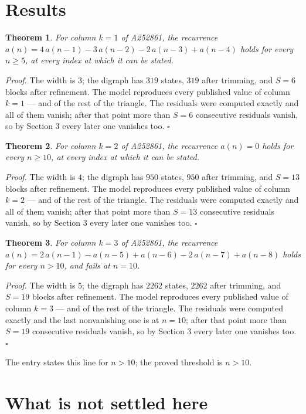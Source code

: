 \documentclass[11pt]{article}
\newtheorem{theorem}{Theorem}
\theoremstyle{definition}
\begin{document}
\section{Results}

\begin{theorem} For column $k = 1$ of A252861, the recurrence $a(n) = 4\,a(n-1) - 3\,a(n-2) - 2\,a(n-3) + a(n-4)$ holds for every $n \ge 5$, at every index at which it can be stated.\end{theorem}

{\itshape Proof.} The width is $3$; the digraph has $319$ states, $319$ after trimming, and $S = 6$ blocks after refinement. The model reproduces every published value of column $k = 1$ --- and of the rest of the triangle. The residuals were computed exactly and all of them vanish; after that point more than $S = 6$ consecutive residuals vanish, so by Section 3 every later one vanishes too. $\square$

\begin{theorem} For column $k = 2$ of A252861, the recurrence $a(n) = 0$ holds for every $n \ge 10$, at every index at which it can be stated.\end{theorem}

{\itshape Proof.} The width is $4$; the digraph has $950$ states, $950$ after trimming, and $S = 13$ blocks after refinement. The model reproduces every published value of column $k = 2$ --- and of the rest of the triangle. The residuals were computed exactly and all of them vanish; after that point more than $S = 13$ consecutive residuals vanish, so by Section 3 every later one vanishes too. $\square$

\begin{theorem} For column $k = 3$ of A252861, the recurrence $a(n) = 2\,a(n-1) - a(n-5) + a(n-6) - 2\,a(n-7) + a(n-8)$ holds for every $n > 10$, and fails at $n = 10$.\end{theorem}

{\itshape Proof.} The width is $5$; the digraph has $2262$ states, $2262$ after trimming, and $S = 19$ blocks after refinement. The model reproduces every published value of column $k = 3$ --- and of the rest of the triangle. The residuals were computed exactly and the last nonvanishing one is at $n = 10$; after that point more than $S = 19$ consecutive residuals vanish, so by Section 3 every later one vanishes too. $\square$

The entry states this line for $n > 10$; the proved threshold is $n > 10$.

\section{What is not settled here}
\end{document}

